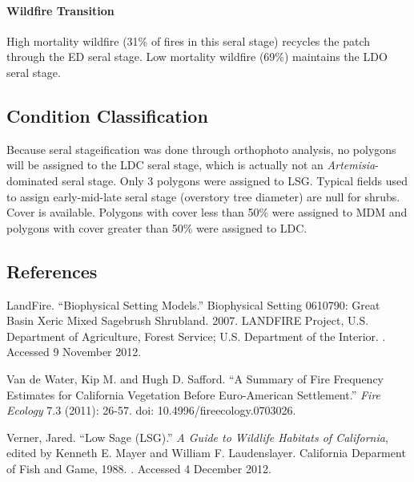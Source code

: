 \paragraph{Wildfire Transition} High mortality wildfire (31\% of fires in this seral stage) recycles the patch through the ED seral stage. Low mortality wildfire (69\%) maintains the LDO seral stage.

\noindent\hrulefill

\subsection*{Condition Classification}
Because seral stageification was done through orthophoto analysis, no polygons will be assigned to the LDC seral stage, which is actually not an \emph{Artemisia}-dominated seral stage. Only 3 polygons were assigned to LSG. Typical fields used to assign early-mid-late seral stage (overstory tree diameter) are null for shrubs. Cover is available. Polygons with cover less than 50\% were assigned to MDM and polygons with cover greater than 50\% were assigned to LDC.



\clearpage
\subsection*{References}
\begin{hangparas}{.25in}{1} LandFire. ``Biophysical Setting Models.'' Biophysical Setting 0610790: Great Basin Xeric Mixed Sagebrush Shrubland. 2007. LANDFIRE Project, U.S. Department of Agriculture, Forest Service; U.S. Department of the Interior. . Accessed 9 November 2012.

Van de Water, Kip M. and Hugh D. Safford. ``A Summary of Fire Frequency Estimates for California Vegetation Before Euro-American Settlement.'' \emph{Fire Ecology} 7.3 (2011): 26-57. doi: 10.4996/fireecology.0703026.

Verner, Jared. ``Low Sage (LSG).'' \emph{A Guide to Wildlife Habitats of California}, edited by Kenneth E. Mayer and William F. Laudenslayer. California Deparment of Fish and Game, 1988. . Accessed 4 December 2012.
\end{hangparas}


